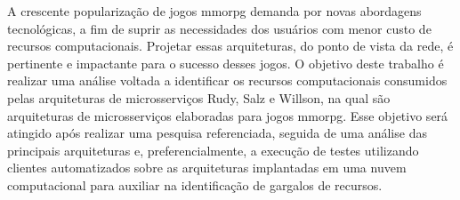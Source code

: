 A crescente popularização de jogos \acf{mmorpg} demanda por novas abordagens tecnológicas, a fim de suprir as necessidades dos usuários com menor custo de recursos computacionais.
%
Projetar essas arquiteturas, do ponto de vista da rede, é pertinente e impactante para o sucesso desses jogos.
%
O objetivo deste trabalho é realizar uma análise voltada a identificar os recursos computacionais consumidos pelas arquiteturas de microsserviços Rudy, Salz e Willson, na qual são arquiteturas de microsserviços elaboradas para jogos \ac{mmorpg}.
%
Esse objetivo será atingido após realizar uma pesquisa referenciada, seguida de uma análise das principais arquiteturas e, preferencialmente, a execução de testes utilizando clientes automatizados sobre as arquiteturas implantadas em uma nuvem computacional para auxiliar na identificação de gargalos de recursos. 
%
\\
